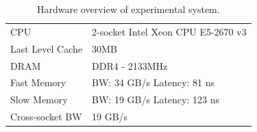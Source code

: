 \begin{spacing}{0.9}
\begin{table}[tbp]
\centering
\small
\vspace{-10pt}
\caption{Hardware overview of experimental system.}
\vspace{-5pt}
\begin{tabular}{ll}
\hline
CPU& 2-socket Intel Xeon CPU E5-2670 v3 \\ %
\textcolor{check}{Last Level Cache} & 30MB \\
DRAM& DDR4 - 2133MHz   \\
Fast Memory & BW: 34 GB/s  \phantom{L}  Latency: 81 ns \\ %
Slow Memory& BW: 19 GB/s  \phantom{L}  Latency: 123 ns\\
Cross-socket BW & 19 GB/s\\ 
\hline
\end{tabular}

\vspace{-5pt}
\label{tab:hardware}
\end{table}



 

\end{spacing}
